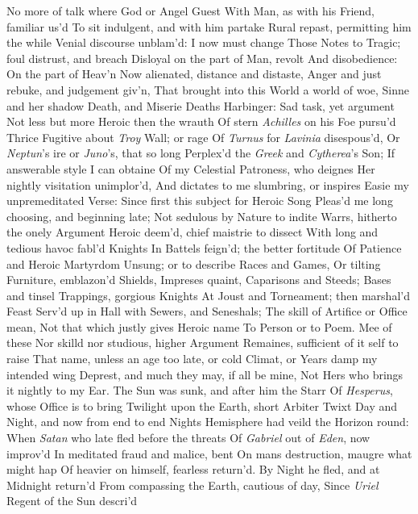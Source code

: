 \documentclass[11pt]{book}
\newcounter {first}
\begin{document}
No more of talk where God or Angel Guest 
With Man, as with his Friend, familiar us'd 
To sit indulgent, and with him partake 
Rural repast, permitting him the while 
Venial discourse unblam'd: I now must change 
Those Notes to Tragic; foul distrust, and breach 
Disloyal on the part of Man, revolt 
And disobedience: On the part of Heav'n 
Now alienated, distance and distaste, 
Anger and just rebuke, and judgement giv'n, 
That brought into this World a world of woe, 
Sinne and her shadow Death, and Miserie 
Deaths Harbinger: Sad task, yet argument 
Not less but more Heroic then the wrauth 
Of stern \textit{Achilles} on his Foe pursu'd 
Thrice Fugitive about \textit{Troy} Wall; or rage 
Of \textit{Turnus} for \textit{Lavinia} disespous'd, 
Or \textit{Neptun}'s ire or \textit{Juno}'s, that so long 
Perplex'd the \textit{Greek} and \textit{Cytherea}'s Son; 
If answerable style I can obtaine 
Of my Celestial Patroness, who deignes 
Her nightly visitation unimplor'd, 
And dictates to me slumbring, or inspires 
Easie my unpremeditated Verse: 
Since first this subject for Heroic Song 
Pleas'd me long choosing, and beginning late; 
Not sedulous by Nature to indite 
Warrs, hitherto the onely Argument 
Heroic deem'd, chief maistrie to dissect 
With long and tedious havoc fabl'd Knights 
In Battels feign'd; the better fortitude 
Of Patience and Heroic Martyrdom 
Unsung; or to describe Races and Games, 
Or tilting Furniture, emblazon'd Shields, 
Impreses quaint, Caparisons and Steeds; 
Bases and tinsel Trappings, gorgious Knights 
At Joust and Torneament; then marshal'd Feast 
Serv'd up in Hall with Sewers, and Seneshals; 
The skill of Artifice or Office mean, 
Not that which justly gives Heroic name 
To Person or to Poem.  Mee of these 
Nor skilld nor studious, higher Argument 
Remaines, sufficient of it self to raise 
That name, unless an age too late, or cold 
Climat, or Years damp my intended wing 
Deprest, and much they may, if all be mine, 
Not Hers who brings it nightly to my Ear. 
\quad The Sun was sunk, and after him the Starr 
Of \textit{Hesperus}, whose Office is to bring 
Twilight upon the Earth, short Arbiter 
Twixt Day and Night, and now from end to end 
Nights Hemisphere had veild the Horizon round: 
When \textit{Satan} who late fled before the threats 
Of \textit{Gabriel} out of \textit{Eden}, now improv'd 
In meditated fraud and malice, bent 
On mans destruction, maugre what might hap 
Of heavier on himself, fearless return'd. 
By Night he fled, and at Midnight return'd 
From compassing the Earth, cautious of day, 
Since \textit{Uriel} Regent of the Sun descri'd 
\end{document}
